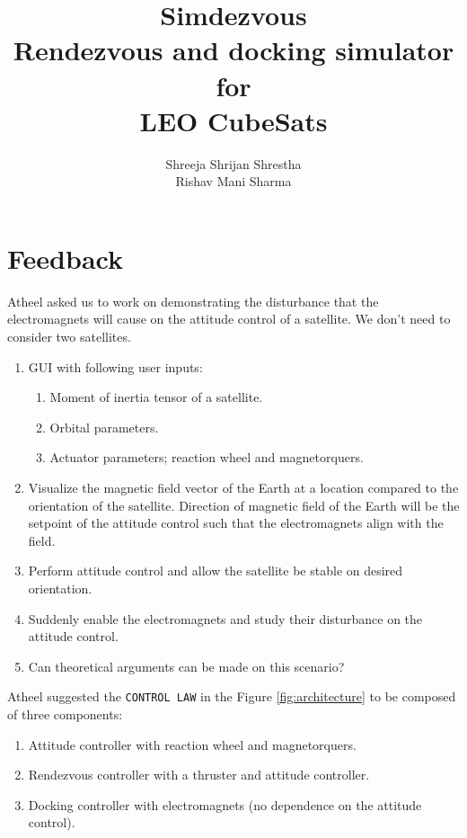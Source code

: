 \documentclass{article}
\title{\textbf{Simdezvous}\\\vspace{0.1in}\large{Rendezvous and docking simulator for\\LEO CubeSats}\vspace{1in}}
\author{Shreeja Shrijan Shrestha\\Rishav Mani Sharma}
\begin{document}
\setlength{\parskip}{0.5em}

\maketitle
\newpage

\tableofcontents
\newpage

\section{Feedback}

Atheel asked us to work on demonstrating the disturbance that the electromagnets will cause on the attitude control of a satellite. We don't need to consider two satellites.

\begin{enumerate}[noitemsep]
  \item GUI with following user inputs:
  \begin{enumerate}[noitemsep]
    \item Moment of inertia tensor of a satellite.
    \item Orbital parameters.
    \item Actuator parameters; reaction wheel and magnetorquers.
  \end{enumerate}
  \item Visualize the magnetic field vector of the Earth at a location compared to the orientation of the satellite. Direction of magnetic field of the Earth will be the setpoint of the attitude control such that the electromagnets align with the field.
  \item Perform attitude control and allow the satellite be stable on desired orientation.
  \item Suddenly enable the electromagnets and study their disturbance on the attitude control.
  \item Can theoretical arguments can be made on this scenario?
\end{enumerate}

Atheel suggested the \texttt{CONTROL LAW} in the Figure \ref{fig:architecture} to be composed of three components:

\begin{enumerate}[noitemsep]
  \item Attitude controller with reaction wheel and magnetorquers.
  \item Rendezvous controller with a thruster and attitude controller.
  \item Docking controller with electromagnets (no dependence on the attitude control).
\end{enumerate}
\end{document}
